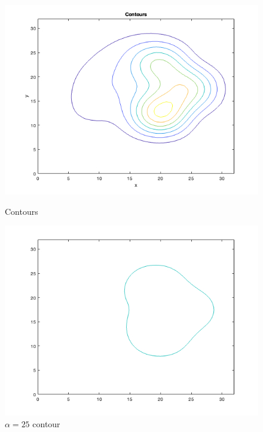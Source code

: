 \begin{figure}[h!]
    \centering
    \begin{minipage}{.5\textwidth}
        \centering
        \includegraphics[width=\linewidth]{figures/ex1_contours.png}
        \caption{Contours}
        \label{fig:figures/ex1_contours.png}
    \end{minipage}%
    \begin{minipage}{.5\textwidth}
        \centering
        \includegraphics[width=\linewidth]{figures/ex1_alpha_contour.png}
        \caption{$ \alpha = 25 $ contour}
        \label{fig:figures/ex1_alpha_contour.png}
    \end{minipage}
\end{figure}


